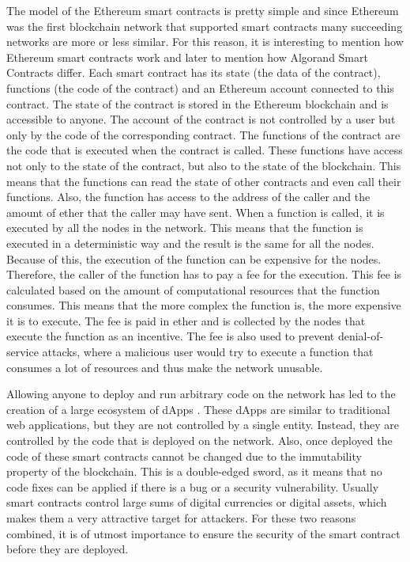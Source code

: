 The model of the Ethereum smart contracts is pretty simple and since Ethereum was the first blockchain network that supported smart contracts many succeeding networks are more or less similar. For this reason, it is interesting to mention how Ethereum smart contracts work and later to mention how Algorand Smart Contracts differ. Each smart contract has its state (the data of the contract), functions (the code of the contract) and an Ethereum account connected to this contract. The state of the contract is stored in the Ethereum blockchain and is accessible to anyone. The account of the contract is not controlled by a user but only by the code of the corresponding contract. The functions of the contract are the code that is executed when the contract is called. These functions have access not only to the state of the contract, but also to the state of the blockchain. This means that the functions can read the state of other contracts and even call their functions. Also, the function has access to the address of the caller and the amount of ether that the caller may have sent. When a function is called, it is executed by all the nodes in the network. This means that the function is executed in a deterministic way and the result is the same for all the nodes. Because of this, the execution of the function can be expensive for the nodes. Therefore, the caller of the function has to pay a fee for the execution. This fee is calculated based on the amount of computational resources that the function consumes. This means that the more complex the function is, the more expensive it is to execute. The fee is paid in ether and is collected by the nodes that execute the function as an incentive. The fee is also used to prevent denial-of-service attacks, where a malicious user would try to execute a function that consumes a lot of resources and thus make the network unusable.

Allowing anyone to deploy and run arbitrary code on the network has led to the creation of a large ecosystem of \acp{dApp} \cite{wu_empirical_2019}. These \acp{dApp} are similar to traditional web applications, but they are not controlled by a single entity. Instead, they are controlled by the code that is deployed on the network. Also, once deployed the code of these smart contracts cannot be changed due to the immutability property of the blockchain. This is a double-edged sword, as it means that no code fixes can be applied if there is a bug or a security vulnerability. Usually smart contracts control large sums of digital currencies or digital assets, which makes them a very attractive target for attackers. For these two reasons combined, it is of utmost importance to ensure the security of the smart contract before they are deployed.


